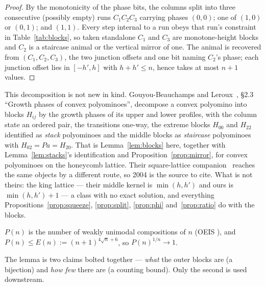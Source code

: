 \documentclass[11pt]{article}
\begin{document}
\begin{proof}
By the monotonicity of the phase bits, the columns split into three consecutive
(possibly empty) runs $C_1C_2C_3$ carrying phases $(0,0)$; one of $(1,0)$ or
$(0,1)$; and $(1,1)$. Every step internal to a run obeys that run's constraint
in Table~\ref{tab:blocks}, so taken standalone $C_1$ and $C_3$ are
monotone-height blocks and $C_2$ is a staircase animal or the vertical mirror of
one. The animal is recovered from $(C_1,C_2,C_3)$, the two junction offsets and
one bit naming $C_2$'s phase; each junction offset lies in $[-h', h]$ with
$h + h' \le n$, hence takes at most $n+1$ values.
\end{proof}

\begin{remark}[attribution --- 1 of 3]
\label{rem:attr1}
This decomposition is not new in kind. Gouyou-Beauchamps and
Leroux~\cite{gblRoux2004}, \S2.3 ``Growth phases of convex polyominoes'',
decompose a convex polyomino into blocks $H_{ij}$ by the growth phases of its
upper and lower profiles, with the column state an ordered pair, the transitions
one-way, the extreme blocks $H_{00}$ and $H_{22}$ identified as \emph{stack}
polyominoes and the middle blocks as \emph{staircase} polyominoes with
$H_{02} = Pa = H_{20}$. That is Lemma~\ref{lem:blocks} here, together with
Lemma~\ref{lem:stacks}'s identification and Proposition~\ref{prop:mirror}, for
convex polyominoes on the honeycomb lattice. Their square-lattice
companion~\cite{lrr1998} reaches the same objects by a different route, so 2004
is the source to cite. What is not theirs: the king lattice --- their middle
kernel is $\min(h,h')$ and ours is $\min(h,h')+1$ --- a class with no exact
solution, and everything Propositions~\ref{prop:squeeze}, \ref{prop:split},
\ref{prop:phi} and~\ref{prop:ratio} do with the blocks.
\end{remark}

\begin{lemma}
\label{lem:stacks}
$P(n)$ is the number of weakly unimodal compositions of $n$ (OEIS
), and $P(n) \le E(n) := (n{+}1)^{4\sqrt n + 6}$, so
$P(n)^{1/n} \to 1$.
\end{lemma}

The lemma is two claims bolted together --- \emph{what} the outer blocks are (a
bijection) and \emph{how few} there are (a counting bound). Only the second is
used downstream.
\end{document}
